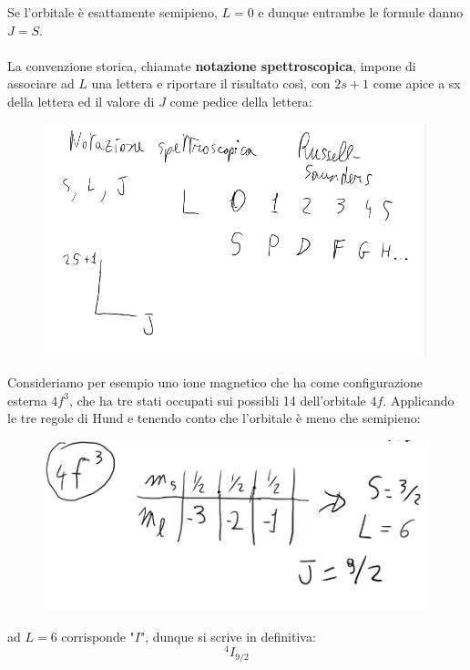 \documentclass{book}
\begin{document}
     Se l'orbitale è esattamente semipieno, $L=0$ e dunque entrambe le formule danno $J=S$.\\ \\
     La convenzione storica, chiamate \textbf{notazione spettroscopica}, impone di associare ad $L$ una lettera e riportare il risultato così, con $2s+1$ come apice a sx della lettera ed il valore di $J$ come pedice della lettera:
     \begin{figure}[h!]
         \centering
         \includegraphics[width=0.5\linewidth]{img/asset3.png}
     \end{figure} \newpage
     Consideriamo per esempio uno ione magnetico che ha come configurazione esterna $4f^{3}$, che ha tre stati occupati sui possibli 14 dell'orbitale $4f$. Applicando le tre regole di Hund e tenendo conto che l'orbitale è meno che semipieno:
     \begin{figure}[h!]
         \centering
         \includegraphics[width=0.75\linewidth]{img/asset4.png}
     \end{figure}
     ad $L=6$ corrisponde "$I$", dunque si scrive in definitiva:
     \begin{equation}
         ^{4}I_{9/2}
     \end{equation}
     \\ \\
\end{document}
